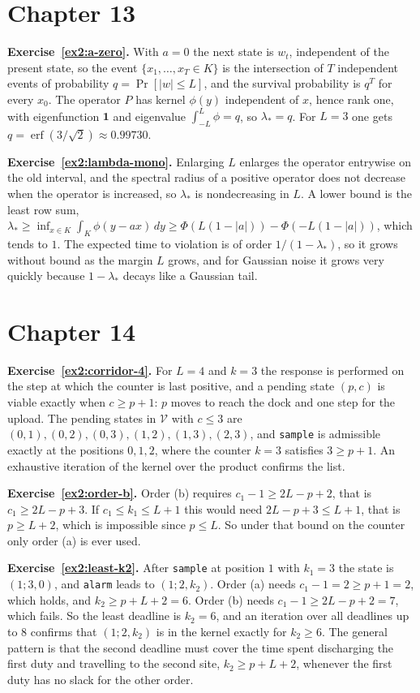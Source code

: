 \section*{Chapter 13}

\textbf{Exercise~\ref{ex2:a-zero}.} With $a=0$ the next state is $w_t$, independent of the present state, so the event $\{x_1,\dots,x_T\in K\}$ is the intersection of $T$ independent events of probability $q=\Pr[|w|\le L]$, and the survival probability is $q^{T}$ for every $x_0$. The operator $P$ has kernel $\phi(y)$ independent of $x$, hence rank one, with eigenfunction $\mathbf 1$ and eigenvalue $\int_{-L}^{L}\phi=q$, so $\lambda_*=q$. For $L=3$ one gets $q=\operatorname{erf}(3/\sqrt2)\approx0.99730$.

\textbf{Exercise~\ref{ex2:lambda-mono}.} Enlarging $L$ enlarges the operator entrywise on the old interval, and the spectral radius of a positive operator does not decrease when the operator is increased, so $\lambda_*$ is nondecreasing in $L$. A lower bound is the least row sum, $\lambda_*\ge\inf_{x\in K}\int_K\phi(y-ax)\,dy\ge\Phi(L(1-|a|))-\Phi(-L(1-|a|))$, which tends to $1$. The expected time to violation is of order $1/(1-\lambda_*)$, so it grows without bound as the margin $L$ grows, and for Gaussian noise it grows very quickly because $1-\lambda_*$ decays like a Gaussian tail.

\section*{Chapter 14}

\textbf{Exercise~\ref{ex2:corridor-4}.} For $L=4$ and $k=3$ the response is performed on the step at which the counter is last positive, and a pending state $(p,c)$ is viable exactly when $c\ge p+1$: $p$ moves to reach the dock and one step for the upload. The pending states in $\mathcal V$ with $c\le3$ are $(0,1),(0,2),(0,3),(1,2),(1,3),(2,3)$, and \texttt{sample} is admissible exactly at the positions $0,1,2$, where the counter $k=3$ satisfies $3\ge p+1$. An exhaustive iteration of the kernel over the product confirms the list.

\textbf{Exercise~\ref{ex2:order-b}.} Order (b) requires $c_1-1\ge2L-p+2$, that is $c_1\ge2L-p+3$. If $c_1\le k_1\le L+1$ this would need $2L-p+3\le L+1$, that is $p\ge L+2$, which is impossible since $p\le L$. So under that bound on the counter only order (a) is ever used.

\textbf{Exercise~\ref{ex2:least-k2}.} After \texttt{sample} at position $1$ with $k_1=3$ the state is $(1;3,0)$, and \texttt{alarm} leads to $(1;2,k_2)$. Order (a) needs $c_1-1=2\ge p+1=2$, which holds, and $k_2\ge p+L+2=6$. Order (b) needs $c_1-1\ge2L-p+2=7$, which fails. So the least deadline is $k_2=6$, and an iteration over all deadlines up to $8$ confirms that $(1;2,k_2)$ is in the kernel exactly for $k_2\ge6$. The general pattern is that the second deadline must cover the time spent discharging the first duty and travelling to the second site, $k_2\ge p+L+2$, whenever the first duty has no slack for the other order.

